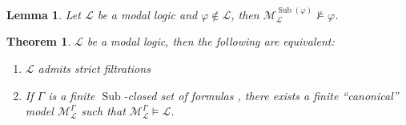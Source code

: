 \documentclass[a4paper]{article}
\theoremstyle{defin}
\theoremstyle{theorem}
\newtheorem{theorem}{Theorem}
\theoremstyle{prop}
\theoremstyle{lemma}
\newtheorem{lemma}{Lemma}
\theoremstyle{fact}
\theoremstyle{ex}
\theoremstyle{col}
\begin{document}
\begin{lemma}
  Let $\mathcal{L}$ be a modal logic and $\varphi \not\in \mathcal{L}$, then $\mathcal{M}_{\mathcal{L}}^{\operatorname{Sub}(\varphi)} \nvDash \varphi$.
\end{lemma}

\begin{theorem} $\mathcal{L}$ be a modal logic, then the following are equivalent:
  \begin{enumerate}
    \item $\mathcal{L}$ admits strict filtrations
    \item If $\Gamma$ is a finite $\operatorname{Sub}$-closed set of formulas , there exists a finite ``canonical'' model $\mathcal{M}_{\mathcal{L}}^{\Gamma}$ such that
    $\mathcal{M}_{\mathcal{L}}^{\Gamma} \models \mathcal{L}$.
  \end{enumerate}
\end{theorem}
\end{document}
